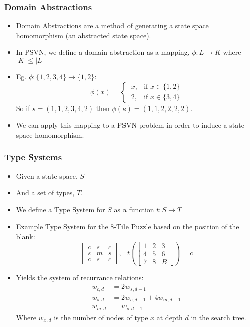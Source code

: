 \documentclass{beamer}
\begin{document}
\begin{frame}
  \frametitle{Domain Abstractions}
  \begin{itemize}
  \item Domain Abstractions are a method of generating a state space homomorphism (an abstracted state space).
  \item In PSVN, we define a domain abstraction as a mapping, \(\phi : L \rightarrow K\) where \(|K| \leq |L|\)
  \item Eg. \(\phi : \{1,2,3,4\} \rightarrow \{1,2\}\):
    \begin{equation*}
      \phi(x) =
      \begin{cases}
        \ x, & \text{if } x \in \{1,2\} \\
        \ 2, & \text{if } x \in \{3,4\}
      \end{cases}
    \end{equation*}
    So if \(s = (1,1,2,3,4,2)\) then \(\phi(s) = (1,1,2,2,2,2) \).
  \item We can apply this mapping to a PSVN problem in order to induce a state space homomorphism.
  \end{itemize}
\end{frame}

\begin{frame}
  \frametitle{Type Systems}
  \begin{itemize}
  \item Given a state-space, \(S\)
  \item And a set of types, \(T\).
  \item We define a Type System for \(S\) as a function \(t : S \rightarrow T\)
  \item Example Type System for the 8-Tile Puzzle based on the position of the blank:
    $$
    \begin{bmatrix}
      c & s & c \\
      s & m & s \\
      c & s & c
    \end{bmatrix},
    \text{ }
    t \left(
    \begin{bmatrix}
      1 & 2 & 3 \\
      4 & 5 & 6 \\
      7 & 8 & B
    \end{bmatrix}
    \right) = c
    $$
  \item Yields the system of recurrance relations:
    \begin{equation*}
    \begin{split}
    w_{c,d} & = 2w_{s,d-1}\\
    w_{s,d} & = 2w_{c,d-1} + 4w_{m,d-1} \\
    w_{m,d} & = w_{s,d-1}
    \end{split}
    \end{equation*}
    Where \(w_{x,d}\) is the number of nodes of type \(x\) at depth \(d\) in the search tree.
  \end{itemize}
\end{frame}
\end{document}
